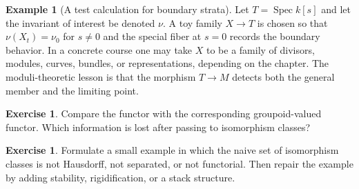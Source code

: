 \documentclass[11pt]{amsart}
\theoremstyle{definition}
\newtheorem{example}[theorem]{Example}
\newtheorem{exercise}[theorem]{Exercise}
\newcommand{\Spec}{\operatorname{Spec}}
\begin{document}
\begin{example}[A test calculation for boundary strata]
Let $T=\Spec k[s]$ and let the invariant of interest be denoted $\nu$.  A toy family $X\to T$ is chosen so that $\nu(X_t)=\nu_0$ for $s\ne0$ and the special fiber at $s=0$ records the boundary behavior.  In a concrete course one may take $X$ to be a family of divisors, modules, curves, bundles, or representations, depending on the chapter.  The moduli-theoretic lesson is that the morphism $T\to M$ detects both the general member and the limiting point.
\end{example}
\begin{exercise}
Compare the functor with the corresponding groupoid-valued functor.  Which information is lost after passing to isomorphism classes?
\end{exercise}
\begin{exercise}
Formulate a small example in which the naive set of isomorphism classes is not Hausdorff, not separated, or not functorial.  Then repair the example by adding stability, rigidification, or a stack structure.
\end{exercise}
\clearpage
\end{document}
